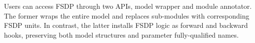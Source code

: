 
Users can access FSDP through two APIs,  model wrapper and  module annotator. The former wraps the entire model and replaces sub-modules with corresponding FSDP units. In contrast, the latter installs FSDP logic as  forward and backward hooks, preserving both model structures and parameter fully-qualified names. 